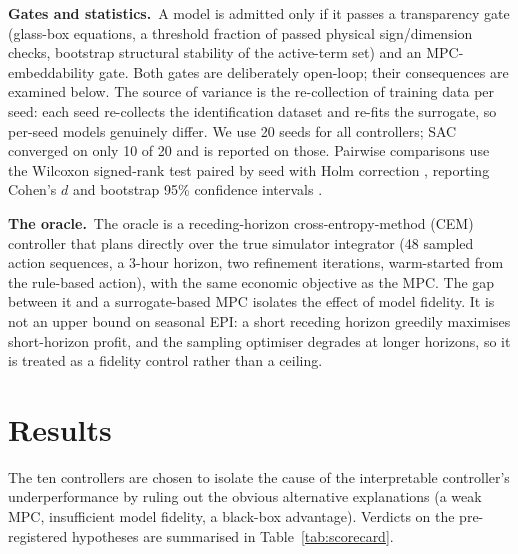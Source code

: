 \documentclass[preprint,3p]{elsarticle}
\begin{document}
\textbf{Gates and statistics.}~A model is admitted only if it passes a transparency
gate (glass-box equations, a threshold fraction of passed physical sign/dimension
checks, bootstrap structural stability of the active-term set) and an
MPC-embeddability gate. Both gates are deliberately open-loop; their consequences are
examined below. The source of variance is the re-collection of training data per
seed: each seed re-collects the identification dataset and re-fits the surrogate, so
per-seed models genuinely differ. We use 20 seeds for all controllers; SAC converged
on only 10 of 20 and is reported on those. Pairwise comparisons use the Wilcoxon
signed-rank test paired by seed \citep{wilcoxon1945} with Holm correction
\citep{holm1979}, reporting Cohen's $d$ and bootstrap 95\% confidence intervals
\citep{efron1994bootstrap,demsar2006}.

\textbf{The oracle.}~The oracle is a receding-horizon cross-entropy-method (CEM)
controller that plans directly over the true simulator integrator (48 sampled action
sequences, a 3-hour horizon, two refinement iterations, warm-started from the
rule-based action), with the same economic objective as the MPC. The gap between it
and a surrogate-based MPC isolates the effect of model fidelity. It is not an upper
bound on seasonal EPI: a short receding horizon greedily maximises short-horizon
profit, and the sampling optimiser degrades at longer horizons, so it is treated as a
fidelity control rather than a ceiling.

\section{Results}
\label{sec:results}

The ten controllers are chosen to isolate the cause of the interpretable controller's
underperformance by ruling out the obvious alternative explanations (a weak MPC,
insufficient model fidelity, a black-box advantage). Verdicts on the pre-registered
hypotheses are summarised in Table~\ref{tab:scorecard}.
\end{document}
